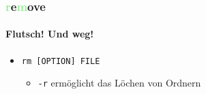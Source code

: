 \documentclass[12pt,utf8]{beamer}
\begin{document}
\begin{frame}
\frametitle{\textcolor{lightGreen}{r}e\textcolor{lightGreen}{m}ove}
\framesubtitle{Flutsch! Und weg!}
\begin{itemize}
	\item \texttt{rm [OPTION] FILE}
	\begin{itemize}[<+->]
		\item \texttt{-r} ermöglicht das Löchen von Ordnern
	\end{itemize}
\end{itemize}
\end{frame}

\end{document}
